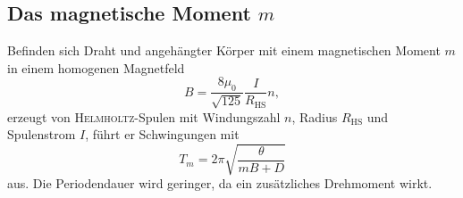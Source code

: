 \subsection{Das magnetische Moment \texorpdfstring{$m$}{m}}

Befinden sich Draht und angehängter Körper mit einem magnetischen Moment $m$ in einem homogenen Magnetfeld 
\begin{equation}
B=\frac{8\mu_0}{\sqrt{125}} \frac{I}{R_\mathup{HS}}n,
\label{eq:B_HS}
\end{equation}
erzeugt von \textsc{Helmholtz}-Spulen mit Windungszahl $n$, Radius $R_\mathup{HS}$ und  Spulenstrom $I$, führt er Schwingungen mit 
\begin{equation}
T_m=2\pi\sqrt{\frac{\theta}{mB+D}}
\label{eq:t_hs}
\end{equation}
aus. Die Periodendauer wird geringer, da ein zusätzliches Drehmoment wirkt.


